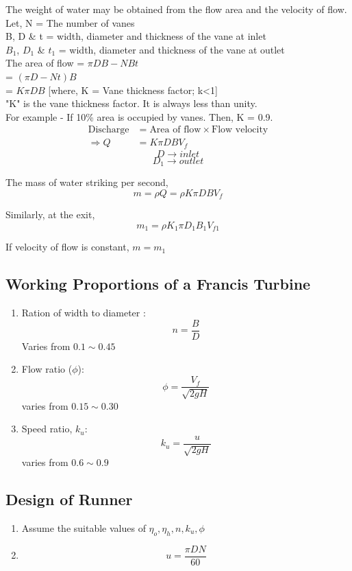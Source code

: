 \documentclass{article}
\begin{document}
\begin{multicols}{2}
  
  The weight of water may be obtained from the flow area and the velocity of flow. \\

  Let, N = The number of vanes \\
  B, D \& t = width, diameter and thickness of the vane at inlet \\
  $B_1$, $D_1$ \& $t_1$ = width, diameter and thickness of the vane at outlet \\

  The area of flow = $\pi D B - N B t$\\
  = $(\pi D - Nt) B$ \\
  = $K\pi DB$ [where, K = Vane thickness factor; k<1] \\

"K" is the vane thickness factor. It is always less than unity. \\

For example - If 10\% area is occupied by vanes. Then, K = 0.9. \\

\begin{align*}
  \text{Discharge} &= \text{Area of flow} \times \text{Flow velocity} \\
  \Rightarrow Q &= K\pi D B V_f 
\end{align*}
$$D \rightarrow inlet$$
$$D_1 \rightarrow outlet$$

The mass of water striking per second,
$$m = \rho Q = \rho K \pi D B V_f$$

Similarly, at the exit,
$$m_1 = \rho K_1 \pi D_1 B_1 V_{f1}$$

If velocity of flow is constant, $m = m_1$

\subsection*{Working Proportions of a Francis Turbine}
\begin{enumerate}
  \item Ration of width to diameter : $$n = \frac{B}{D}$$ Varies from $0.1 \sim  0.45$
  \item  Flow ratio ($\phi$): $$\phi = \frac{V_f}{\sqrt{2gH}}$$ varies from $0.15 \sim 0.30$
  \item Speed ratio, $k_u$: $$k_u = \frac{u}{\sqrt{2gH}}$$ varies from $0.6 \sim 0.9$
\end{enumerate}

\subsection*{Design of Runner}
\begin{enumerate}
  \item Assume the suitable values of $\eta_o, \eta_h, n, k_u, \phi$ 
  \item $$u= \frac{\pi D N}{60}$$
\end{enumerate}


\end{multicols}
\end{document}
